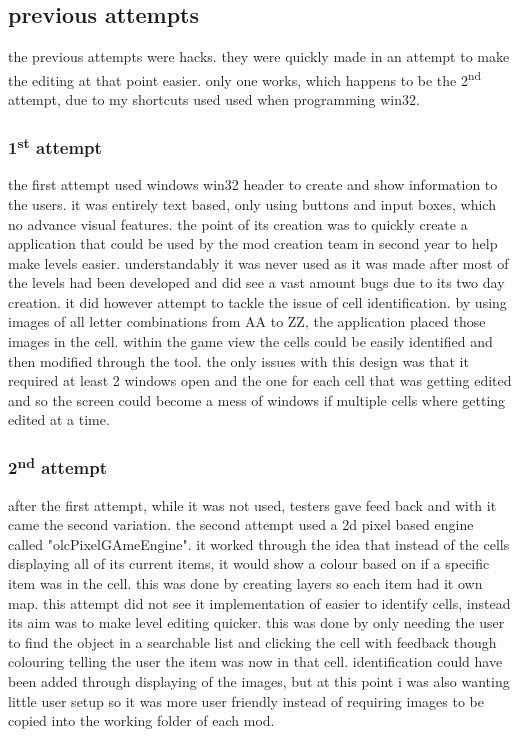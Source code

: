 \subsection{previous attempts}
the previous attempts were hacks. they were quickly made in an attempt to make the editing at that point easier. only one works, which happens to be the 2\textsuperscript{nd} attempt, due to my shortcuts used used when programming win32.
\subsubsection{1\textsuperscript{st} attempt}
the first attempt used windows win32 header to create and show information to the users. it was entirely text based, only using buttons and input boxes, which no advance visual features. the point of its creation was to quickly create a application that could be used by the mod creation team in second year to help make levels easier. understandably it was never used as it was made after most of the levels had been developed and did see a vast amount bugs due to its two day creation. 
it did however attempt to tackle the issue of cell identification. by using images of all letter combinations from AA to ZZ, the application placed those images in the cell. within the game view the cells could be easily identified and then modified through the tool. the only issues with this design was that it required at least 2 windows open and the one for each cell that was getting edited and so the screen could become a mess of windows if multiple cells where getting edited at a time.
\subsubsection{2\textsuperscript{nd} attempt}
after the first attempt, while it was not used, testers gave feed back and with it came the second variation. the second attempt used a 2d pixel based engine called "olcPixelGAmeEngine". it worked through the idea that instead of the cells displaying all of its current items, it would show a colour based on if a specific item was in the cell. this was done by creating layers so each item had it own map.
this attempt did not see it implementation of easier to identify cells, instead its aim was to make level editing quicker. this was done by only needing the user to find the object in a searchable list and clicking the cell with feedback though colouring telling the user the item was now in that cell. identification could have been added through displaying of the images, but at this point i was also wanting little user setup so it was more user friendly instead of requiring images to be copied into the working folder of each mod.
